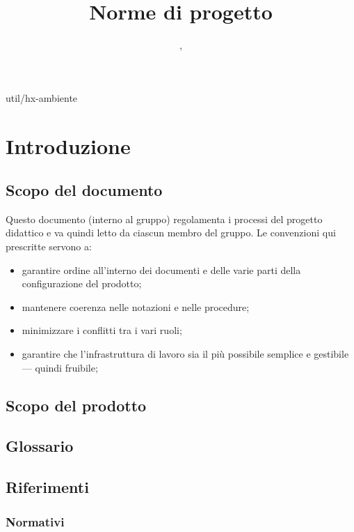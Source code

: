 
 {util/hx-ambiente}
\author{\GG, \MM}
\supervisor{\LB, \AZ}
\title{Norme di progetto}

\renewcommand{\arraystretch}{1.5}
\setcounter{tocdepth}{4}
\setcounter{secnumdepth}{4}


\maketitle

\tableofcontents

\section{Introduzione}

\subsection{Scopo del documento}
Questo documento (interno al gruppo) regolamenta i processi del progetto didattico e va quindi letto da ciascun membro del gruppo. Le convenzioni qui prescritte servono a:
\begin{itemize}
	\item garantire ordine all'interno dei documenti e delle varie parti della configurazione del prodotto;
	\item mantenere coerenza nelle notazioni e nelle procedure;
	\item minimizzare i conflitti tra i vari ruoli;
	\item garantire che l'infrastruttura di lavoro sia il più possibile semplice e gestibile --- quindi fruibile;
\end{itemize}

\subsection{Scopo del prodotto}
\scopo %

	\subsection{Glossario}
	\subsection{Riferimenti}
		\subsubsection{Normativi}
